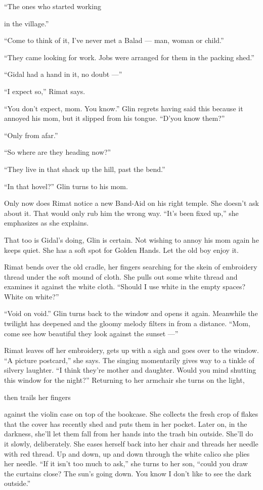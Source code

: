 \documentclass[twoside,11pt,openany]{book}
\begin{document}
``The ones who started working{ in the village.''

``Come to think of it, I've never met a Balad --- man,
woman or child.''

``They came looking for work. Jobs were arranged for them in the
packing shed.''

``Gidal had a hand in it, no doubt ---''

``I expect so,'' Rimat says.

``You
don't expect, mom.
You know.'' Glin regrets having said
this because it annoyed his  mom, but it slipped from his tongue.
``D'you know them?''

``Only from afar.''

``So where are they heading now?''

``They live in that shack up the
hill, past the bend.''

``In that hovel?'' Glin turns to his mom.

Only now does Rimat notice a new
Band-Aid {on his right temple. She doesn't ask about it. T}hat would
only rub him the wrong way. ``It's been fixed up,{}'' she emphasizes
as she explains.

That too is Gidal's doing, Glin is certain. Not wishing to annoy his
mom again he keeps quiet. She has a soft spot for Golden Hands. Let
the old boy enjoy it.

{Rimat bends over the old cradle, her fingers searching for the
}skein {of embroidery thread under the soft mound of cloth. She
pulls }out some {white thread and examines it against the white
cloth. ``Should I use white in the }empty{ spaces? White on white?''}

``Void on void.'' Glin
turns back to the window and opens it again. Meanwhile the twilight
has deepened and the gloomy melody filters in from a distance. ``Mom, come see how beautiful they look against the
sunset ---''

Rimat leaves off her embroidery, gets up with a sigh and goes over to
the window. ``A picture postcard,'' she says. The singing momentarily gives way to a tinkle of silvery laughter. ``I
think they're mother and daughter. Would you mind shutting this window for the
night?''
Returning to her armchair
she turns on the light, }then trails her fingers {against the violin
case on top of the
bookcase. She collects the fresh crop of flakes that the cover has recently shed and
puts them in her pocket. Later on, in the
darkness, she'll let them fall from her hands into the trash
bin outside. She'll do it slowly, deliberately. She eases herself
back into her chair and threads her needle with red thread. Up and down, up and down through the white calico she
plies her needle.  ``If it
isn't too much to
ask,'' she turns to her son, ``could you
draw the curtains close? The sun's going down. You know I don't like
to see the dark outside.''

}
\end{document}
